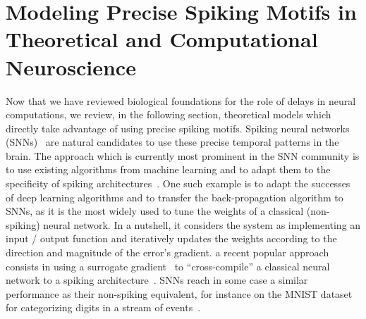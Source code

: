 \documentclass[brainsci, %
               review,accept,pdftex,moreauthors
               ]{Definitions/mdpi}
\begin{document}
\section{Modeling Precise Spiking Motifs in Theoretical and Computational Neuroscience}
Now that we have reviewed biological foundations for the role of delays in neural computations, we review, in the following section, theoretical models which directly take advantage of using precise spiking motifs. 
Spiking neural networks (SNNs)~\citep{maass_networks_1997} are natural candidates to use these precise temporal patterns in the brain. The approach which is currently most prominent in the SNN community is to use existing algorithms from machine learning and to adapt them to the specificity of spiking architectures~\citep{goltz_fast_2021}. One such example is to adapt the successes of deep learning algorithms and to transfer the back-propagation algorithm to SNNs, as it is the most widely used to tune the weights of a classical (non-spiking) neural network. In a nutshell, it considers the system as implementing an input / output function and iteratively updates the weights according to the direction and magnitude of the error's gradient.  a recent popular approach consists in using a surrogate gradient~\citep{neftci_surrogate_2019} to ``cross-compile'' a classical neural network to a spiking architecture~\citep{rueckauer_conversion_2017}. SNNs reach in some case a similar performance as their non-spiking equivalent, for instance on the MNIST dataset for categorizing digits in a stream of events~\citep{susi_nmnsd-spiking_2021}. 
\end{document}
